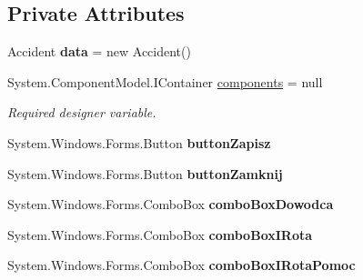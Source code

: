 \subsection*{Private Attributes}
\begin{DoxyCompactItemize}
\item 
\mbox{\label{class_statystyki___o_s_p_1_1_accident_form_a40035139aa9122b031a0f3096a14ae05}} 
Accident {\bfseries data} = new Accident()
\item 
System.\+Component\+Model.\+I\+Container \mbox{\hyperlink{class_statystyki___o_s_p_1_1_accident_form_aaadd06e4110b8e8f7858f98e0ebaed72}{components}} = null
\begin{DoxyCompactList}\small\item\em Required designer variable. \end{DoxyCompactList}\item 
\mbox{\label{class_statystyki___o_s_p_1_1_accident_form_a40b42d16bf687af8e8da7e606fd62963}} 
System.\+Windows.\+Forms.\+Button {\bfseries button\+Zapisz}
\item 
\mbox{\label{class_statystyki___o_s_p_1_1_accident_form_a8eeb9c19ca34bc925052eb1b411ba0fe}} 
System.\+Windows.\+Forms.\+Button {\bfseries button\+Zamknij}
\item 
\mbox{\label{class_statystyki___o_s_p_1_1_accident_form_ad613255775aa802180704fc3eeb1657f}} 
System.\+Windows.\+Forms.\+Combo\+Box {\bfseries combo\+Box\+Dowodca}
\item 
\mbox{\label{class_statystyki___o_s_p_1_1_accident_form_ab037de5aa63e92eca0ddd008d63ca1b7}} 
System.\+Windows.\+Forms.\+Combo\+Box {\bfseries combo\+Box\+I\+Rota}
\item 
\mbox{\label{class_statystyki___o_s_p_1_1_accident_form_a059a65df3d895f6af52aeae49a4228af}} 
System.\+Windows.\+Forms.\+Combo\+Box {\bfseries combo\+Box\+I\+Rota\+Pomoc}
\item 
\mbox{\label{class_statystyki___o_s_p_1_1_accident_form_a7f986dae3b74d0a1d87d18d92eebfa01}} 

\end{DoxyCompactItemize}
